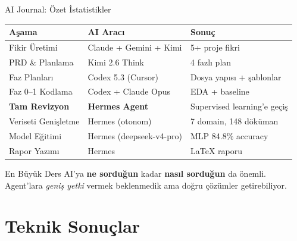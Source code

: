 \documentclass[10pt,aspectratio=43]{beamer}
\begin{document}
\begin{frame}{AI Journal: Özet İstatistikler}
  \begin{table}
    \small
    \begin{tabular}{lll}
      \toprule
      \textbf{Aşama} & \textbf{AI Aracı} & \textbf{Sonuç} \\
      \midrule
      Fikir Üretimi & Claude + Gemini + Kimi & 5+ proje fikri \\
      PRD \& Planlama & Kimi 2.6 Think & 4 fazlı plan \\
      Faz Planları & Codex 5.3 (Cursor) & Dosya yapısı + şablonlar \\
      Faz 0–1 Kodlama & Codex + Claude Opus & EDA + baseline \\
      \textbf{Tam Revizyon} & \textbf{Hermes Agent} & Supervised learning'e geçiş \\
      Veriseti Genişletme & Hermes (otonom) & 7 domain, 148 döküman \\
      Model Eğitimi & Hermes (deepseek-v4-pro) & MLP 84.8\% accuracy \\
      Rapor Yazımı & Hermes & LaTeX raporu \\
      \bottomrule
    \end{tabular}
  \end{table}

  \vspace{0.3em}
  \begin{alertblock}{En Büyük Ders}
    AI'ya \textbf{ne sorduğun} kadar \textbf{nasıl sorduğun} da önemli. \\
    Agent'lara \textit{geniş yetki} vermek beklenmedik ama doğru çözümler getirebiliyor.
  \end{alertblock}
\end{frame}

\section{Teknik Sonuçlar}
\end{document}
